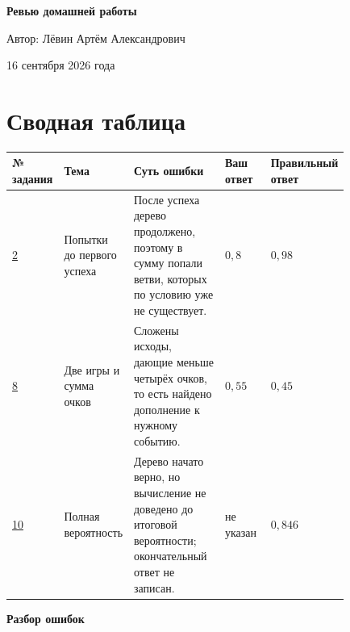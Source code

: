 \documentclass[12pt,a4paper]{article}
\begin{document}
\begin{titlepage}
\centering
\vspace*{0.24\textheight}
{\LARGE\bfseries Ревью домашней работы\par}
\vspace{1.6cm}
{\large Автор: Лёвин Артём Александрович\par}
\vspace{0.8cm}
{\large 16 сентября 2026 года\par}
\vfill
{}
\end{titlepage}

\newpage
\section*{Сводная таблица}
\small
\begin{center}
\begin{tabular}{>{\centering\arraybackslash}p{0.08\linewidth}
                p{0.18\linewidth}
                p{0.29\linewidth}
                p{0.14\linewidth}
                p{0.14\linewidth}}
\toprule
№ задания & Тема & Суть ошибки & Ваш ответ & Правильный ответ \\
\midrule
\hyperref[task:2]{2} & Попытки до первого успеха & После успеха дерево продолжено, поэтому в сумму попали ветви, которых по условию уже не существует. & $0{,}8$ & $0{,}98$ \\
\addlinespace
\hyperref[task:8]{8} & Две игры и сумма очков & Сложены исходы, дающие меньше четырёх очков, то есть найдено дополнение к нужному событию. & $0{,}55$ & $0{,}45$ \\
\addlinespace
\hyperref[task:10]{10} & Полная вероятность & Дерево начато верно, но вычисление не доведено до итоговой вероятности; окончательный ответ не записан. & не указан & $0{,}846$ \\
\bottomrule
\end{tabular}
\end{center}
\normalsize

\newpage
\vspace*{\fill}
\begin{center}
{\LARGE\bfseries Разбор ошибок}
\end{center}
\vspace*{\fill}
\end{document}
